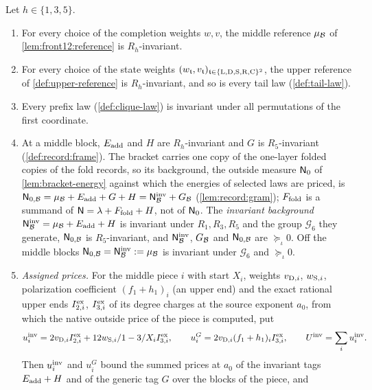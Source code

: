 \begin{lemma}\label{lem:oct24:invariant-background}
Let $h\in\{1,3,5\}$.
\begin{enumerate}[label=(\roman*)]
\item For every choice of the completion weights $w,v$, the middle reference
 $\mu_\mathcal B$ of \cref{lem:front12:reference} is $R_h$-invariant.
\item For every choice of the state weights
 $(w_{\mathfrak t},v_{\mathfrak t})_{\mathfrak t\in\{\rm L,D,S,R,C\}^2}$,
 the upper reference of \cref{def:upper-reference} is $R_h$-invariant, and so is
 every tail law (\cref{def:tail-law}).
\item Every prefix law (\cref{def:clique-law}) is invariant under all
 permutations of the first coordinate.
\item At a middle block, $E_{\rm add}$ and $H$ are $R_h$-invariant and $G$ is
 $R_5$-invariant (\cref{def:record:frame}). The bracket carries one copy of the
 one-layer folded copies of the fold records, so its background, the outside measure $\mathsf N_0$ of
 \cref{lem:bracket-energy} against which the energies of selected laws are priced, is
 $\mathsf N_{0,\mathcal B}=\mu_\mathcal B+E_{\rm add}+G+H=\mathsf N^{\rm inv}_\mathcal B+G_\mathcal B$ (\cref{lem:record:gram});
 $F_{\rm fold}$ is a summand of $\mathsf N=\lambda+F_{\rm fold}+H$, not of $\mathsf N_0$. The
 \emph{invariant background} $\mathsf N^{\rm inv}_\mathcal B=\mu_\mathcal B+E_{\rm add}+H$ is invariant
 under $R_1,R_3,R_5$ and the group $\mathcal G_6$ they generate, $\mathsf N_{0,\mathcal B}$ is
 $R_5$-invariant, and $\mathsf N^{\rm inv}_\mathcal B$, $G_\mathcal B$ and $\mathsf N_{0,\mathcal B}$ are $\succeq_\iota0$.
 Off the middle blocks $\mathsf N_{0,\mathcal B}=\mathsf N^{\rm inv}_\mathcal B:=\mu_\mathcal B$ is invariant under
 $\mathcal G_6$ and $\succeq_\iota0$.
\item \emph{Assigned prices.} For the middle piece $i$ with start $X_i$, weights
 $v_{{\rm D},i}$, $w_{{\rm S},i}$, polarization coefficient $(f_1+h_1)_i$ (an upper end)
 and the exact rational upper ends $I^{\rm ex}_{2,i}$, $I^{\rm ex}_{3,i}$ of its degree
 charges at the source exponent $a_0$, from which the native outside price of the
 piece is computed, put
 \begin{equation}\label{eq:invariant-price}
  u^{\rm inv}_i=2v_{{\rm D},i}I^{\rm ex}_{2,i}+12w_{{\rm S},i}/1-3/X_iI^{\rm ex}_{3,i},
  \qquad u^G_i=2v_{{\rm D},i}(f_1+h_1)_iI^{\rm ex}_{3,i},\qquad
  U^{\mathrm{inv}}=\sum_iu^{\rm inv}_i .
 \end{equation}
 Then $u^{\rm inv}_i$ and $u^G_i$ bound the summed prices at $a_0$ of the invariant
 tags $E_{\rm add}+H$ and of the generic tag $G$ over the blocks of the piece, and

\end{enumerate}
\end{lemma}
